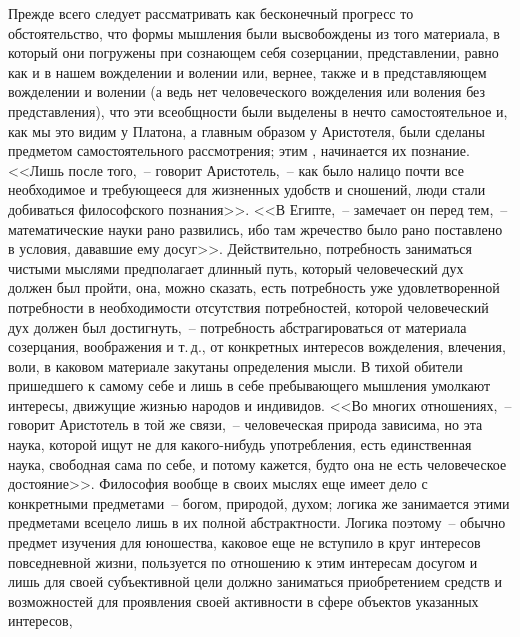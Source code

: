 
Прежде всего следует рассматривать как бесконечный
прогресс то обстоятельство, что формы мышления были
высвобождены из того материала, в который они погружены
при сознающем себя созерцании, представлении,
равно как и в нашем вожделении и волении или, вернее,
также и в представляющем вожделении и волении (а ведь
нет человеческого вожделения или воления без представления),
что эти всеобщности были выделены в нечто самостоятельное
и, как мы это видим у Платона, а главным
образом у Аристотеля, были сделаны предметом самостоятельного
рассмотрения; этим , начинается их познание.
<<Лишь после того,~-- говорит Аристотель,~-- как было налицо
почти все необходимое и требующееся для жизненных
удобств и сношений, люди стали добиваться философского
познания>>. <<В Египте,~-- замечает он перед
тем,~-- математические науки рано развились, ибо там
жречество было рано поставлено в условия, дававшие
ему досуг>>.
Действительно, потребность заниматься чистыми
мыслями предполагает длинный путь, который
человеческий дух должен был пройти, она, можно сказать,
есть потребность уже удовлетворенной потребности
в необходимости отсутствия потребностей, которой человеческий
дух должен был достигнуть,~-- потребность абстрагироваться
от материала созерцания, воображения
и т.\,д., от конкретных интересов вожделения, влечения,
воли, в каковом материале закутаны определения мысли.
В тихой обители пришедшего к самому себе и лишь в себе
пребывающего мышления умолкают интересы, движущие
жизнью народов и индивидов. <<Во многих отношениях,~--
говорит Аристотель в той же связи,~-- человеческая природа
зависима, но эта наука, которой ищут не для какого-нибудь
употребления, есть единственная наука, свободная
сама по себе, и потому кажется, будто она не есть человеческое
достояние>>\endnotemark{}. Философия вообще в своих мыслях
еще имеет дело с конкретными предметами~-- богом, природой,
духом; логика же занимается этими предметами
всецело лишь в их полной абстрактности. Логика поэтому~--
обычно предмет изучения для юношества, каковое
еще не вступило в круг интересов повседневной жизни,
пользуется по отношению к этим интересам досугом и
лишь для своей субъективной цели должно заниматься
приобретением средств и возможностей для проявления
своей активности в сфере объектов указанных интересов,
